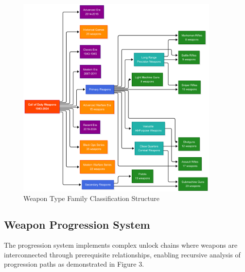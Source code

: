 \documentclass[12pt,a4paper]{article}
\begin{document}
\begin{figure}[H]
    \centering
    \includegraphics[width=0.9\textwidth]{../diagrams/weapon-type-family-classification-vertical.png}
    \caption{Weapon Type Family Classification Structure}
\end{figure}

\subsection{Weapon Progression System}

The progression system implements complex unlock chains where weapons are
interconnected through prerequisite relationships, enabling recursive analysis
of progression paths as demonstrated in Figure 3.
\end{document}
